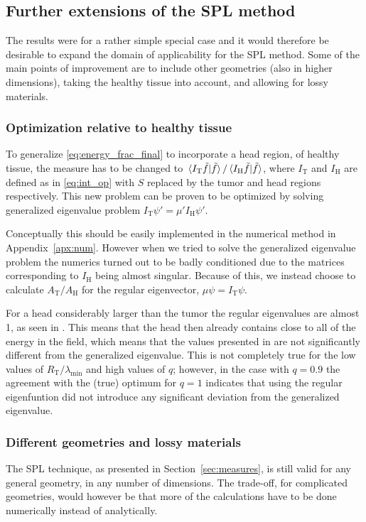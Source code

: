 \documentclass[11pt,a4paper, 
swedish,english %
]{article}
\newcommand{\RT}{\ensuremath{R_{\text{T}}}}
\newcommand{\tf}{\ensuremath{\tilde{f}}}
\begin{document}
\subsection{Further extensions of the SPL method}
The results were for a rather simple special case and it would
therefore be desirable to expand the domain of applicability for the
SPL method. Some of the main points of improvement are to include other 
geometries (also in higher dimensions), taking the healthy
tissue into account, and allowing for lossy materials.

\subsubsection{Optimization relative to healthy tissue}
To generalize \eqref{eq:energy_frac_final} to
incorporate a head region, of healthy tissue, the measure has to
be changed to $\ip*{I_\text{T}\tf}{\tf}/\ip*{I_\text{H}\tf}{\tf}$, where 
$I_\text{T}$ and $I_\text{H}$ are defined as in \eqref{eq:int_op} with
$S$ replaced by the tumor and head regions respectively. 
This new problem can be proven to be optimized by solving
generalized eigenvalue problem $I_\text{T}\psi'=\mu'I_\text{H}\psi'$.

Conceptually this should be easily implemented in the numerical method
in Appendix~\ref{apx:num}. However when we tried to solve the
generalized eigenvalue problem the numerics turned out to be badly
conditioned due to the matrices corresponding to $I_\text{H}$ being
almost singular. Because of this, we instead choose to calculate
$A_\text{T}/A_\text{H}$ for the regular eigenvector,
$\mu\psi=I_\text{T}\psi$. 


For a head considerably larger than the tumor the
regular eigenvalues are almost 1, as seen in . This
means that the head then already contains close to all of the energy
in the field, which means that the values presented in
 are not significantly different from the generalized
eigenvalue. 
This is not completely true for the low values of
$\RT/\lambda_{\min}$ and high values of $q$; however, in the case with
$q=0.9$ the agreement with the (true) optimum for $q=1$ indicates that
using the regular eigenfuntion did not introduce any significant
deviation from the generalized eigenvalue.


\subsubsection{Different geometries and lossy materials}
The SPL technique, as presented in Section~\ref{sec:measures}, is
still valid for any general geometry, in any number of dimensions.
The trade-off, for complicated geometries, would however be that more
of the calculations have to be done numerically instead of analytically. 
\end{document}
